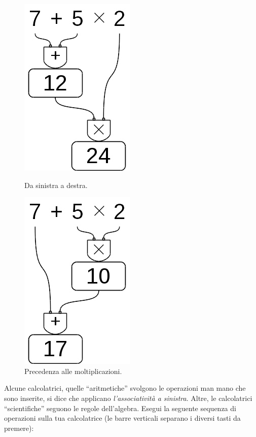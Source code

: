 \begin{inaccessibleblock}[]
\begin{figure}[h]
 \centering
 \begin{minipage}[t]{.40\textwidth}
  \centering\includegraphics[scale=0.35]{img/op_prec1.png}
  \caption{Da sinistra a destra.}\label{fig:op_prec1}
 \end{minipage}\hfil
 \begin{minipage}[t]{.50\textwidth}
  \centering\includegraphics[scale=0.35]{img/op_prec2.png}
  \caption{Precedenza alle moltiplicazioni.}\label{fig:op_prec2}
 \end{minipage}
\end{figure}
\end{inaccessibleblock}

\osservazione Alcune calcolatrici, quelle ``aritmetiche'' svolgono le 
operazioni man mano che sono inserite, si dice che applicano 
\emph{l'associatività a sinistra}. Altre, le calcolatrici ``scientifiche'' 
seguono le regole dell'algebra. Esegui la seguente sequenza di operazioni 
sulla tua calcolatrice 
(le barre verticali separano i diversi tasti da premere):

